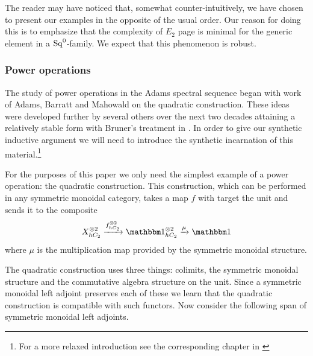 \begin{rmk}
  The reader may have noticed that, somewhat counter-intuitively, we have chosen to present our examples in the opposite of the usual order. Our reason for doing this is to emphasize that the complexity of $E_2$ page is minimal for the generic element in a $\operatorname{\mathrm{Sq}}^0$-family. We expect that this phenomenon is robust.
\end{rmk}


\subsubsection{Power operations}\hfill

The study of power operations in the Adams spectral sequence began with work of Adams, Barratt and Mahowald on the quadratic construction. These ideas were developed further by several others over the next two decades attaining a relatively stable form with Bruner's treatment in \cite{BMMS}.
In order to give our synthetic inductive argument we will need to introduce the synthetic incarnation of this material.\footnote{For a more relaxed introduction see the corresponding chapter in \cite{cookware}}

For the purposes of this paper we only need the simplest example of a power operation: the quadratic construction. This construction, which can be performed in any symmetric monoidal category, takes a map $f$ with target the unit and sends it to the composite
\[ X^{\otimes 2}_{hC_2} \xrightarrow{f^{\otimes 2}_{hC_2}} \o^{\otimes 2}_{hC_2} \xrightarrow{\mu} \o \]
where $\mu$ is the multiplication map provided by the symmetric monoidal structure.

The quadratic construction uses three things: colimits, the symmetric monoidal structure and the commutative algebra structure on the unit. Since a symmetric monoidal left adjoint preserves each of these we learn that the quadratic construction is compatible with such functors. Now consider the following span of symmetric monoidal left adjoints.

\begin{center}
\end{center}

